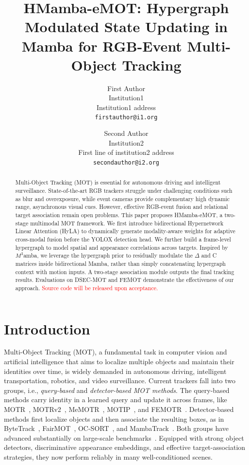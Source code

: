 \documentclass[10pt,twocolumn,letterpaper]{article}
\title{HMamba-eMOT: Hypergraph Modulated State Updating in Mamba for RGB-Event Multi-Object Tracking}
\author{First Author\\
Institution1\\
Institution1 address\\
{\tt\small firstauthor@i1.org}
\and
Second Author\\
Institution2\\
First line of institution2 address\\
{\tt\small secondauthor@i2.org}
}
\begin{document}
\maketitle

\begin{abstract}
Multi-Object Tracking (MOT) is essential for autonomous driving and intelligent surveillance. State-of-the-art RGB trackers struggle under challenging conditions such as blur and overexposure, while event cameras provide complementary high dynamic range, asynchronous visual cues. However, effective RGB-event fusion and relational target association remain open problems. This paper proposes HMamba-eMOT, a two-stage multimodal MOT framework. We first introduce bidirectional Hypernetwork Linear Attention (HyLA) to dynamically generate modality-aware weights for adaptive cross-modal fusion before the YOLOX detection head. We further build a frame-level hypergraph to model spatial and appearance correlations across targets. Inspired by \(M^3\)amba, we leverage the hypergraph prior to residually modulate the \(\Delta\) and C matrices inside bidirectional Mamba, rather than simply concatenating hypergraph context with motion inputs. A two-stage association module outputs the final tracking results. Evaluations on DSEC-MOT and FEMOT demonstrate the effectiveness of our approach.
\textcolor{red}{Source code will be released upon acceptance.} 
\end{abstract}





\section{Introduction}

Multi-Object Tracking (MOT), a fundamental task in computer vision and artificial intelligence that aims to localize multiple objects and maintain their identities over time, is widely demanded in autonomous driving, intelligent transportation, robotics, and video surveillance.  
Current trackers fall into two groups, i.e., \textit{query-based} and \textit{detector-based MOT methods}.  
The query-based methods carry identity in a learned query and update it across frames, like MOTR~\cite{zeng2022motr}, MOTRv2~\cite{zhang2023motrv2}, MeMOTR~\cite{gao2023memotr}, MOTIP~\cite{gao2025motip}, and FEMOTR~\cite{wang2026femot}. 
Detector-based methods first localize objects and then associate the resulting boxes, as in ByteTrack~\cite{zhang2022bytetrack}, FairMOT~\cite{zhang2021fairmot}, OC-SORT~\cite{cao2023ocsort}, and MambaTrack~\cite{huang2024mambatrack}. 
Both groups have advanced substantially on large-scale benchmarks~\cite{milan2016mot16,dendorfer2020mot20,sun2022dancetrack,yu2020bdd100k}. 
Equipped with strong object detectors, discriminative appearance embeddings, and effective target-association strategies, they now perform reliably in many well-conditioned scenes. 
\end{document}
